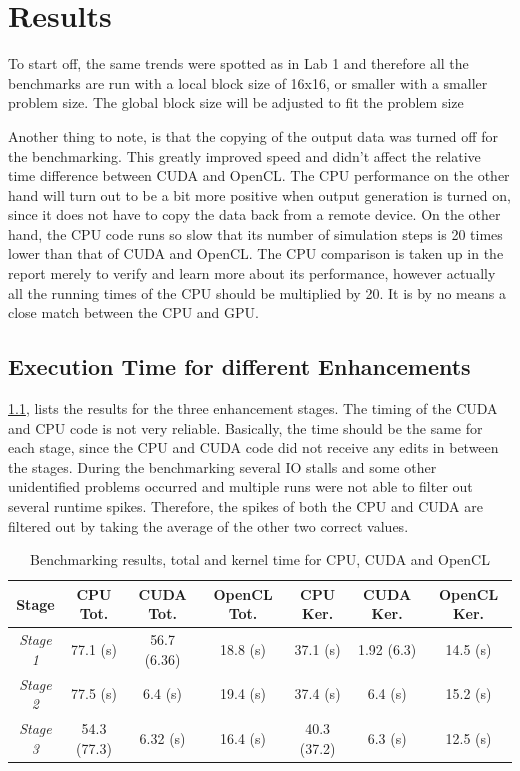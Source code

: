 \documentclass[final]{report}
\begin{document}
\chapter{Results}
To start off, the same trends were spotted as in Lab 1 and therefore all the benchmarks are run with a local block size of 16x16, or smaller with a smaller problem size.
The global block size will be adjusted to fit the problem size

Another thing to note, is that the copying of the output data was turned off for the benchmarking.
This greatly improved speed and didn't affect the relative time difference between CUDA and OpenCL.
The CPU performance on the other hand will turn out to be a bit more positive when output generation is turned on, since it does not have to copy the data back from a remote device.
On the other hand, the CPU code runs so slow that its number of simulation steps is 20 times lower than that of CUDA and OpenCL.
The CPU comparison is taken up in the report merely to verify and learn more about its performance, however actually all the running times of the CPU should be multiplied by 20.
It is by no means a close match between the CPU and GPU.

\section{Execution Time for different Enhancements}
\cref{tab:results}, lists the results for the three enhancement stages.
The timing of the CUDA and CPU code is not very reliable.
Basically, the time should be the same for each stage, since the CPU and CUDA code did not receive any edits in between the stages.
During the benchmarking several IO stalls and some other unidentified problems occurred and multiple runs were not able to filter out several runtime spikes.
Therefore, the spikes of both the CPU and CUDA are filtered out by taking the average of the other two correct values.

\begin{table}[H]
	\centering
	\caption{Benchmarking results, total and kernel time for CPU, CUDA and OpenCL}
	\label{tab:results}
	\begin{tabular}{ccccccc}
		\toprule
			\textbf{Stage}		& \textbf{CPU Tot.}	& \textbf{CUDA Tot.}	& \textbf{OpenCL Tot.}	& \textbf{CPU Ker.}	& \textbf{CUDA Ker.}	& \textbf{OpenCL Ker.}\\
		\midrule
			\textit{Stage 1}	& 77.1 (s)			& 56.7 (6.36)			& 18.8 (s) 				& 37.1 (s) 			& 1.92 (6.3)			& 14.5 (s)	\\
			\textit{Stage 2}	& 77.5 (s)			& 6.4 (s) 				& 19.4 (s) 				& 37.4 (s) 			& 6.4 (s) 				& 15.2 (s)	\\
			\textit{Stage 3}	& 54.3 (77.3)		& 6.32 (s) 				& 16.4 (s) 				& 40.3 (37.2) 		& 6.3 (s) 				& 12.5 (s)	\\
		\bottomrule
	\end{tabular}
\end{table}
\end{document}
